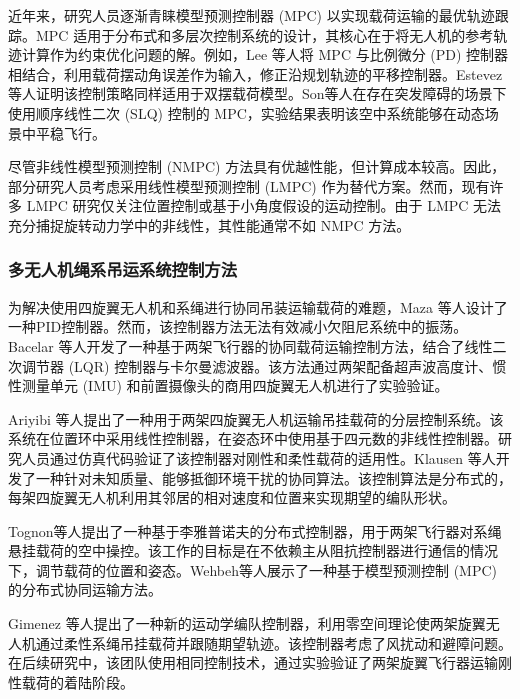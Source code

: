 \documentclass[lang=chs, degree=master, blindreview=true, winfonts=true]{yanputhesis}
\begin{document}
近年来，研究人员逐渐青睐模型预测控制器 (MPC) 以实现载荷运输的最优轨迹跟踪\cite{urbina2021predictive}。MPC 适用于分布式和多层次控制系统的设计，其核心在于将无人机的参考轨迹计算作为约束优化问题的解。例如，Lee 等人\cite{lee2015study}将 MPC 与比例微分 (PD) 控制器相结合，利用载荷摆动角误差作为输入，修正沿规划轨迹的平移控制器。Estevez 等人\cite{estevez2021hybrid}证明该控制策略同样适用于双摆载荷模型。Son等人\cite{son2018model}在存在突发障碍的场景下使用顺序线性二次 (SLQ) 控制的 MPC，实验结果表明该空中系统能够在动态场景中平稳飞行。

尽管非线性模型预测控制 (NMPC) 方法具有优越性能，但计算成本较高\cite{norouzi2022deep}。因此，部分研究人员考虑采用线性模型预测控制 (LMPC) 作为替代方案。然而，现有许多 LMPC 研究仅关注位置控制\cite{bangura2014real}或基于小角度假设的运动控制\cite{alexis2014trajectory}。由于 LMPC 无法充分捕捉旋转动力学中的非线性，其性能通常不如 NMPC 方法\cite{nguyen2021model}。

\subsubsection{多无人机绳系吊运系统控制方法}
为解决使用四旋翼无人机和系绳进行协同吊装运输载荷的难题，Maza 等人\cite{maza2010multi}设计了一种PID控制器。然而，该控制器方法无法有效减小欠阻尼系统中的振荡。Bacelar 等人\cite{bacelar2020board}开发了一种基于两架飞行器的协同载荷运输控制方法，结合了线性二次调节器 (LQR) 控制器与卡尔曼滤波器。该方法通过两架配备超声波高度计、惯性测量单元 (IMU) 和前置摄像头的商用四旋翼无人机进行了实验验证。

Ariyibi 等人\cite{ariyibi2020quaternion}提出了一种用于两架四旋翼无人机运输吊挂载荷的分层控制系统。该系统在位置环中采用线性控制器，在姿态环中使用基于四元数的非线性控制器。研究人员通过仿真代码验证了该控制器对刚性和柔性载荷的适用性。Klausen 等人\cite{klausen2018cooperative}开发了一种针对未知质量、能够抵御环境干扰的协同算法。该控制算法是分布式的，每架四旋翼无人机利用其邻居的相对速度和位置来实现期望的编队形状。

Tognon等人\cite{tognon2018aerial}提出了一种基于李雅普诺夫的分布式控制器，用于两架飞行器对系绳悬挂载荷的空中操控。该工作的目标是在不依赖主从阻抗控制器进行通信的情况下，调节载荷的位置和姿态。Wehbeh等人\cite{wehbeh2020distributed}展示了一种基于模型预测控制 (MPC) 的分布式协同运输方法。

Gimenez 等人\cite{gimenez2018multi}提出了一种新的运动学编队控制器，利用零空间理论使两架旋翼无人机通过柔性系绳吊挂载荷并跟随期望轨迹。该控制器考虑了风扰动和避障问题。在后续研究中，该团队使用相同控制技术，通过实验验证了两架旋翼飞行器运输刚性载荷的着陆阶段\cite{gimenez2020control}。
\end{document}
